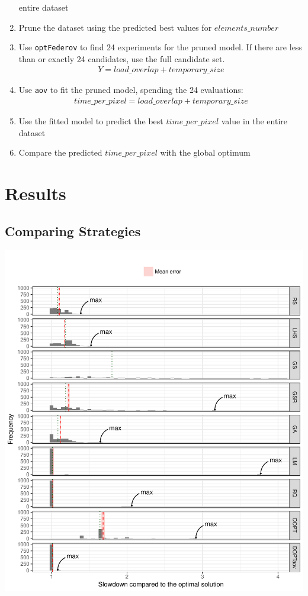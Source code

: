 \documentclass[final,12pt,a4paper]{article}
\begin{document}
\begin{enumerate}
entire dataset
\item Prune the dataset using the predicted best values for \(elements\_number\)
\item Use \texttt{optFederov} to find 24 experiments for the pruned model. If there are less
than or exactly 24 candidates, use the full candidate set.
\begin{align*}
    Y = load\_overlap + temporary\_size
\end{align*}
\item Use \texttt{aov} to fit the pruned model, spending the 24 evaluations:
\begin{align*}
      time\_per\_pixel = load\_overlap + temporary\_size
\end{align*}
\item Use the fitted model to predict the best \(time\_per\_pixel\) value in the
entire dataset
\item Compare the predicted \(time\_per\_pixel\) with the global optimum
\end{enumerate}
\section{Results}
\label{sec:org67cb3ca}
\subsection{Comparing Strategies}
\label{sec:org4b942c1}
\begin{center}
\includegraphics[width=.9\linewidth]{../img/comparison_histogram.pdf}
\end{center}
\end{document}
